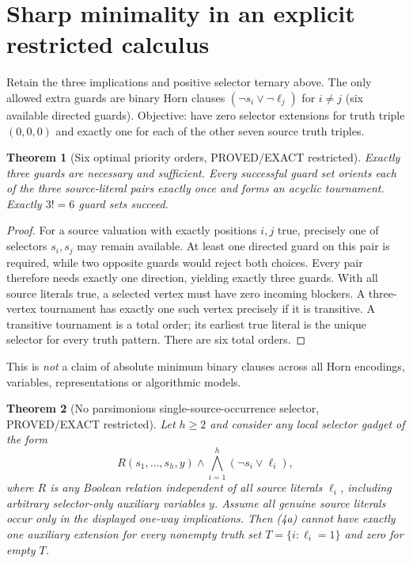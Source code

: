 \documentclass[11pt]{article}
\newtheorem{theorem}{Theorem}
\begin{document}
\section{Sharp minimality in an explicit restricted calculus}
Retain the three implications and positive selector ternary above. The only allowed extra guards are binary Horn clauses $(\neg s_i\vee\neg\ell_j)$ for $i\ne j$ (six available directed guards). Objective: have zero selector extensions for truth triple $(0,0,0)$ and exactly one for each of the other seven source truth triples.
\begin{theorem}[Six optimal priority orders, PROVED/EXACT restricted]
Exactly three guards are necessary and sufficient. Every successful guard set orients each of the three source-literal pairs exactly once and forms an acyclic tournament. Exactly $3!=6$ guard sets succeed.
\end{theorem}
\begin{proof}
For a source valuation with exactly positions $i,j$ true, precisely one of selectors $s_i,s_j$ may remain available. At least one directed guard on this pair is required, while two opposite guards would reject both choices. Every pair therefore needs exactly one direction, yielding exactly three guards. With all source literals true, a selected vertex must have zero incoming blockers. A three-vertex tournament has exactly one such vertex precisely if it is transitive. A transitive tournament is a total order; its earliest true literal is the unique selector for every truth pattern. There are six total orders.
\end{proof}
This is \emph{not} a claim of absolute minimum binary clauses across all Horn encodings, variables, representations or algorithmic models.
\begin{theorem}[No parsimonious single-source-occurrence selector, PROVED/EXACT restricted]
Let $h\ge2$ and consider any local selector gadget of the form
\[
R(s_1,\ldots,s_h,y)\wedge
\bigwedge_{i=1}^{h}(\neg s_i\vee\ell_i),
\tag{4a}
\]
where $R$ is any Boolean relation independent of all source literals
$\ell_i$, including arbitrary selector-only auxiliary variables $y$.
Assume all genuine source literals occur \emph{only} in the displayed
one-way implications. Then (4a) cannot have exactly one auxiliary
extension for every nonempty truth set
$T=\{i:\ell_i=1\}$ and zero for empty $T$.
\end{theorem}
\end{document}
